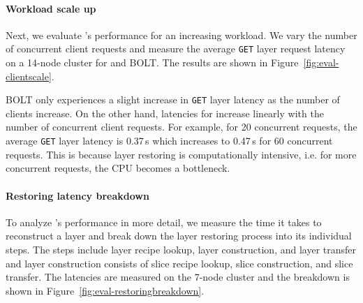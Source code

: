 \paragraph{Workload scale up}
%
Next, we evaluate \sysname{}'s performance for an increasing workload.
%
We vary the number of concurrent client requests and measure the average \texttt{GET} layer
request latency on a 14-node cluster for \sysname and BOLT.
%
The results are shown in Figure~\ref{fig:eval-clientscale}.

BOLT only experiences a slight increase in \texttt{GET} layer latency as the number of clients increase.
%
On the other hand, latencies for \sysname increase linearly with the number of concurrent client requests.
%
For example, for 20 concurrent requests, the average \texttt{GET} layer latency is 0.37\,s which
increases to 0.47\,s for 60 concurrent requests.
%
This is because layer restoring is computationally intensive, i.e. for more concurrent requests, the CPU
becomes a bottleneck.

\paragraph{Restoring latency breakdown}
%
To analyze \sysname{}'s performance in more detail, we measure the time it takes
to reconstruct a layer and break down the layer restoring process into its individual steps.
%
The steps include layer recipe lookup, layer construction, and layer transfer and
layer construction consists of slice recipe lookup, slice construction, and slice transfer.
%
%
%
%
%
The latencies are measured on the 7-node cluster and the breakdown is shown in
Figure~\ref{fig:eval-restoringbreakdown}.

